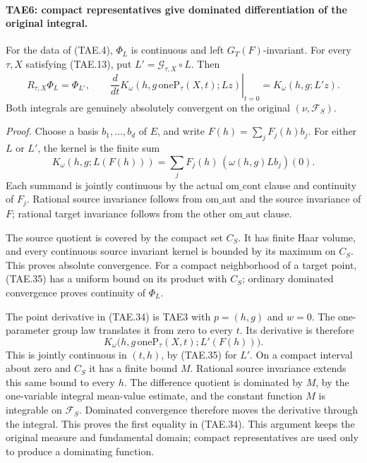 \paragraph{TAE6: compact representatives give dominated differentiation of the original integral.}
\label{claim:TAE6}
For the data of (TAE.4), \(\Phi_L\) is continuous and left
\(G_T(F)\)-invariant.  For every \(\tau,X\) satisfying
(TAE.13), put \(L'=\mathcal G_{\tau,X}\circ L\).  Then
\[
 R_{\tau,X}\Phi_L=\Phi_{L'},\qquad
 \left.\frac{d}{dt}
     K_\omega(h,g\,\mathrm{oneP}_\tau(X,t);Lz)
       \right|_{t=0}
     =K_\omega(h,g;L'z).
 \tag{TAE.34}
\]
Both integrals are genuinely absolutely convergent on the
original \((\nu,\mathcal F_S)\).

\emph{Proof.}
Choose a basis \(b_1,\ldots,b_d\) of \(E\), and write
\(F(h)=\sum_jF_j(h)b_j\).  For either \(L\) or \(L'\), the
kernel is the finite sum
\[
 K_\omega(h,g;L(F(h)))
          =\sum_j F_j(h)\,(\omega(h,g)Lb_j)(0).
 \tag{TAE.35}
\]
Each summand is jointly continuous by the actual
\(\mathrm{om\_cont}\) clause and continuity of \(F_j\).
Rational source invariance follows from
\(\mathrm{om\_aut}\) and the source invariance of \(F\);
rational target invariance follows from the other
\(\mathrm{om\_aut}\) clause.

The source quotient is covered by the compact set \(C_S\).
It has finite Haar volume, and every continuous source
invariant kernel is bounded by its maximum on \(C_S\).
This proves absolute convergence.  For a compact neighborhood
of a target point, (TAE.35) has a uniform bound on its product
with \(C_S\); ordinary dominated convergence proves
continuity of \(\Phi_L\).

The point derivative in (TAE.34) is TAE3 with \(p=(h,g)\)
and \(w=0\).  The one-parameter group law translates it
from zero to every \(t\).  Its derivative is therefore
\[
 K_\omega\bigl(h,g\,\mathrm{oneP}_\tau(X,t);L'(F(h))\bigr).
 \tag{TAE.36}
\]
This is jointly continuous in \((t,h)\), by (TAE.35) for
\(L'\).  On a compact interval about zero and \(C_S\) it has
a finite bound \(M\).  Rational source invariance extends
this same bound to every \(h\).
The difference quotient is dominated by \(M\), by the
one-variable integral mean-value estimate, and the constant
function \(M\) is integrable on \(\mathcal F_S\).
Dominated convergence therefore moves the derivative through
the integral.  This proves the first equality in (TAE.34).
This argument keeps the original measure and fundamental
domain; compact representatives are used only to produce a
dominating function.

